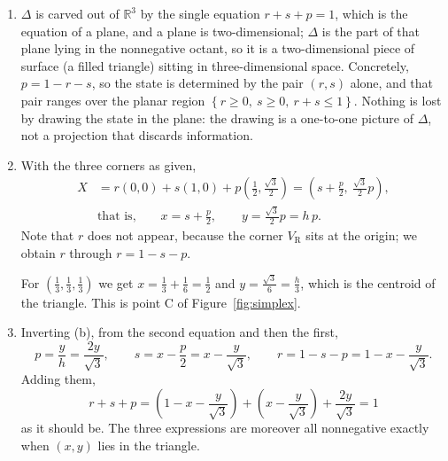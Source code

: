 \documentclass[a4paper,12pt]{article}
\newcommand{\R}{\mathbb{R}}
\begin{document}
\begin{enumerate}[label=(\alph*)]
\item $\Delta$ is carved out of $\R^3$ by the single equation $r+s+p=1$, which is the equation of a plane, and a plane is two-dimensional; $\Delta$ is the part of that plane lying in the nonnegative octant, so it is a two-dimensional piece of surface (a filled triangle) sitting in three-dimensional space. Concretely, $p=1-r-s$, so the state is determined by the pair $\left( r,s \right)$ alone, and that pair ranges over the planar region $\left\{ r \geq 0, \ s\geq 0, \ r+s \leq 1 \right\}$. Nothing is lost by drawing the state in the plane: the drawing is a one-to-one picture of $\Delta$, not a projection that discards information.

\item With the three corners as given,
\[ \begin{aligned}
X &= r\left( 0,0 \right) + s\left( 1,0 \right) + p\left( \tfrac12,\tfrac{\sqrt3}{2} \right)
= \left( s+\tfrac{p}{2}, \ \tfrac{\sqrt3}{2}p \right) ,\\
&\text{that is,} \qquad x = s + \frac{p}{2}, \qquad y = \frac{\sqrt3}{2}p = h\,p .
\end{aligned} \]
Note that $r$ does not appear, because the corner $V_{\text{R}}$ sits at the origin; we obtain $r$ through $r=1-s-p$.

For $\left( \frac13,\frac13,\frac13 \right)$ we get $x = \frac13+\frac16 = \frac12$ and $y = \frac{\sqrt3}{6} = \frac{h}{3}$, which is the centroid of the triangle. This is point C of Figure~\ref{fig:simplex}.

\item Inverting (b), from the second equation and then the first,
\[ p = \frac{y}{h} = \frac{2y}{\sqrt3},
\qquad
s = x - \frac{p}{2} = x - \frac{y}{\sqrt3},
\qquad
r = 1-s-p = 1 - x - \frac{y}{\sqrt3} . \]
Adding them,
\[ r+s+p = \left( 1-x-\frac{y}{\sqrt3} \right) + \left( x - \frac{y}{\sqrt3} \right) + \frac{2y}{\sqrt3} = 1 \]
as it should be. The three expressions are moreover all nonnegative exactly when $\left( x,y \right)$ lies in the triangle.


\end{enumerate}
\end{document}
